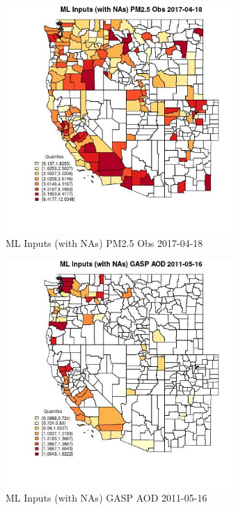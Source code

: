 \begin{figure} 
\centering  
\includegraphics[width=0.77\textwidth]{Code_Outputs/Report_ML_input_PM25_Step4_part_e_de_duplicated_aveswNAs_CountyPM25_ObsMean2017-04-18_2017-04-18.jpg} 
\caption{\label{fig:Report_ML_input_PM25_Step4_part_e_de_duplicated_aveswNAsCountyPM25_ObsMean2017-04-18_2017-04-18}ML Inputs (with NAs) PM2.5 Obs 2017-04-18} 
\end{figure} 
 

\begin{figure} 
\centering  
\includegraphics[width=0.77\textwidth]{Code_Outputs/Report_ML_input_PM25_Step4_part_e_de_duplicated_aveswNAs_CountyGASP_AODMean2011-05-16_2011-05-16.jpg} 
\caption{\label{fig:Report_ML_input_PM25_Step4_part_e_de_duplicated_aveswNAsCountyGASP_AODMean2011-05-16_2011-05-16}ML Inputs (with NAs) GASP AOD 2011-05-16} 
\end{figure} 
 

